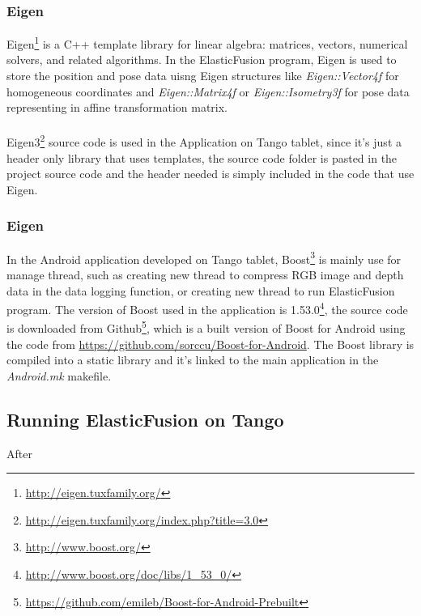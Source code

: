 \documentclass[12pt,twoside]{article}
\begin{document}
\subsubsection{Eigen}
Eigen\footnote{\url{http://eigen.tuxfamily.org/}} is a C++ template library for linear algebra: matrices, vectors, numerical solvers, and related algorithms. In the ElasticFusion program, Eigen is used to store the position and pose data uisng Eigen structures like \textit{Eigen::Vector4f} for homogeneous coordinates and \textit{Eigen::Matrix4f} or \textit{Eigen::Isometry3f} for pose data representing in affine transformation matrix.\\
\\
Eigen3\footnote{\url{http://eigen.tuxfamily.org/index.php?title=3.0}} source code is used in the Application on Tango tablet, since it's just a header only library that uses templates, the source code folder is pasted in the project source code and the header needed is simply included in the code that use Eigen.\\



\subsubsection{Eigen}
In the Android application developed on Tango tablet, Boost\footnote{\url{http://www.boost.org/}} is mainly use for manage thread, such as creating new thread to compress RGB image and depth data in the data logging function, or creating new thread to run ElasticFusion program. The version of Boost used in the application is 1.53.0\footnote{\url{http://www.boost.org/doc/libs/1_53_0/}}, the source code is downloaded from Github\footnote{\url{https://github.com/emileb/Boost-for-Android-Prebuilt}}, which is a built version of Boost for Android using the code from \url{https://github.com/sorccu/Boost-for-Android}. The Boost library is compiled into a static library and it's linked to the main application in the \textit{Android.mk} makefile. 


\newpage



\subsection{Running ElasticFusion on Tango}

After 
\end{document}
